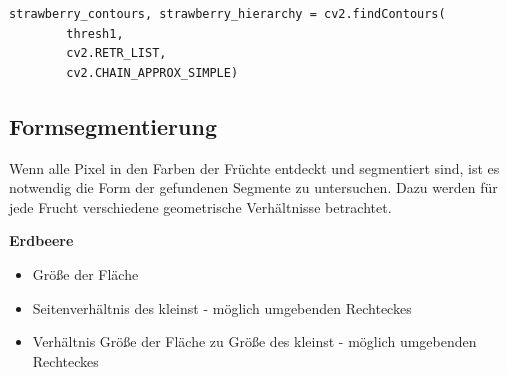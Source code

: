\lstset{language=Python}
\begin{lstlisting}[]
    strawberry_contours, strawberry_hierarchy = cv2.findContours(
        thresh1,
        cv2.RETR_LIST,
        cv2.CHAIN_APPROX_SIMPLE)
\end{lstlisting}

\subsection{Formsegmentierung}

Wenn alle Pixel in den Farben der Früchte entdeckt und segmentiert sind, ist es notwendig die Form der gefundenen Segmente zu untersuchen. Dazu werden für jede Frucht verschiedene geometrische Verhältnisse betrachtet.

\textbf{Erdbeere}

\begin{itemize}
    \item Größe der Fläche
    \item Seitenverhältnis des kleinst - möglich umgebenden Rechteckes
    \item Verhältnis Größe der Fläche zu Größe des kleinst - möglich umgebenden Rechteckes
\end{itemize}


